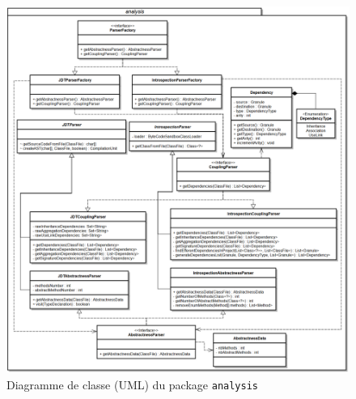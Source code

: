 \documentclass{scrartcl}
\begin{document}
    \begin{figure}[ht!]
        \centering
        \includegraphics[width=\textwidth]{img/uml/analysis.png}
        \caption{Diagramme de classe (UML) du package \texttt{analysis}}
    \end{figure}
\end{document}
